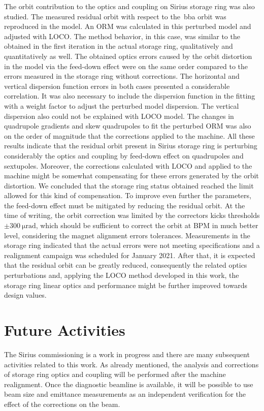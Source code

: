 The orbit contribution to the optics and coupling on Sirius storage ring was also studied. The measured residual orbit with respect to the~\gls{bba} orbit was reproduced in the model. An ORM was calculated in this perturbed model and adjusted with LOCO. The method behavior, in this case, was similar to the obtained in the first iteration in the actual storage ring, qualitatively and quantitatively as well. The obtained optics errors caused by the orbit distortion in the model via the feed-down effect were on the same order compared to the errors measured in the storage ring without corrections. The horizontal and vertical dispersion function errors in both cases presented a considerable correlation. It was also necessary to include the dispersion function in the fitting with a weight factor to adjust the perturbed model dispersion. The vertical dispersion also could not be explained with LOCO model. The changes in quadrupole gradients and skew quadrupoles to fit the perturbed ORM was also on the order of magnitude that the corrections applied to the machine. All these results indicate that the residual orbit present in Sirius storage ring is perturbing considerably the optics and coupling by feed-down effect on quadrupoles and sextupoles. Moreover, the corrections calculated with LOCO and applied to the machine might be somewhat compensating for these errors generated by the orbit distortion. We concluded that the storage ring status obtained reached the limit allowed for this kind of compensation. To improve even further the parameters, the feed-down effect must be mitigated by reducing the residual orbit. At the time of writing, the orbit correction was limited by the correctors kicks thresholds $\pm\SI{300}{\micro\radian}$, which should be sufficient to correct the orbit at BPM in much better level, considering the magnet alignment errors tolerances. Measurements in the storage ring indicated that the actual errors were not meeting specifications and a realignment campaign was scheduled for January 2021. After that, it is expected that the residual orbit can be greatly reduced, consequently the related optics perturbations and, applying the LOCO method developed in this work, the storage ring linear optics and performance might be further improved towards design values. 
\section*{Future Activities}
The Sirius commissioning is a work in progress and there are many subsequent activities related to this work. As already mentioned, the analysis and corrections of storage ring optics and coupling will be performed after the machine realignment. Once the diagnostic beamline is available, it will be possible to use beam size and emittance measurements as an independent verification for the effect of the corrections on the beam. 

